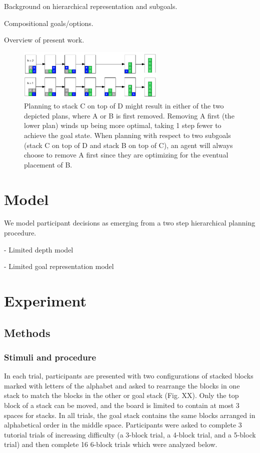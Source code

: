 \documentclass[10pt,letterpaper]{article}
\begin{document}
Background on hierarchical representation and subgoals.

Compositional goals/options.

Overview of present work.

\begin{figure}[ht]
    \centering
    \includegraphics[width=7cm]{example-4-block}
    \caption{Planning to stack C on top of D might result in either of the two depicted plans, where A or B is first removed. Removing A first (the lower plan) winds up being more optimal, taking 1 step fewer to achieve the goal state. When planning with respect to two subgoals (stack C on top of D and stack B on top of C), an agent will always choose to remove A first since they are optimizing for the eventual placement of B.}
\end{figure}



\section{Model}
We model participant decisions as emerging from a two step hierarchical planning procedure. 

- Limited depth model

- Limited goal representation model



\section{Experiment}

\subsection{Methods}
\subsubsection{Stimuli and procedure}

In each trial, participants are presented with two configurations of stacked blocks marked with letters of the alphabet and asked to rearrange the blocks in one stack to match the blocks in the other or goal stack (Fig. XX). Only the top block of a stack can be moved, and the board is limited to contain at most 3 spaces for stacks. In all trials, the goal stack contains the same blocks arranged in alphabetical order in the middle space. Participants were asked to complete 3 tutorial trials of increasing difficulty (a 3-block trial, a 4-block trial, and a 5-block trial) and then complete 16 6-block trials which were analyzed below.
\end{document}
